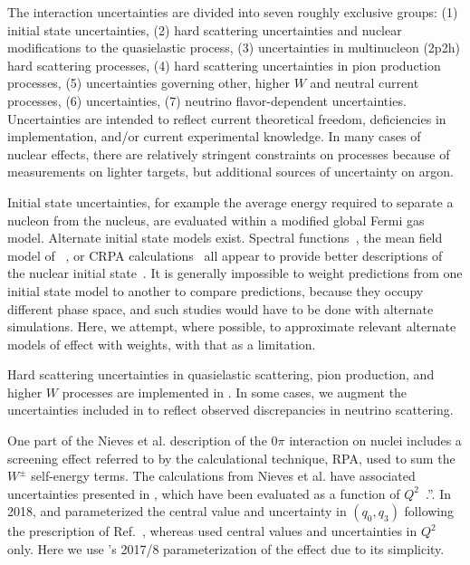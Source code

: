The interaction uncertainties are divided into seven roughly exclusive groups: (1) initial state uncertainties, (2) hard scattering uncertainties and nuclear modifications to the quasielastic process, (3) uncertainties in multinucleon (2p2h) hard scattering processes, (4) hard scattering uncertainties in pion production processes, (5) uncertainties governing other, higher $W$ and neutral current processes, (6)  uncertainties, (7) neutrino flavor-dependent uncertainties. Uncertainties are intended to reflect current theoretical freedom, deficiencies in implementation, and/or current experimental knowledge.  In many cases of nuclear effects, there are relatively stringent constraints on processes because of measurements on lighter targets, but additional sources of uncertainty on argon. 


Initial state uncertainties, for example the average energy required to separate a nucleon from the nucleus, are evaluated within a modified global Fermi gas model.  Alternate initial state models exist. Spectral functions~\cite{Benhar:1994hw,Nieves:2004wx}, the mean field model of ~\cite{Gallmeister:2016dnq}, or %
CRPA calculations~\cite{Pandey:2014tza} all appear to  provide better descriptions of the nuclear initial state~\cite{Sobczyk:2017mts}.   It is generally impossible to weight predictions from one initial state model to another to compare predictions, because they occupy different phase space, and such studies would have to be done with alternate  simulations. Here, we attempt, where possible, to approximate relevant alternate models of effect with weights, with that as a limitation.

Hard scattering uncertainties in quasielastic scattering,  pion production, and higher $W$ processes are implemented in .  In some cases, we augment the uncertainties included in  to reflect observed discrepancies in neutrino scattering.

One part of the Nieves et al.\cite{nieves1,nieves2} description of the $0\pi$ interaction on nuclei includes a screening effect referred to by the calculational technique, RPA, used to sum the $W^\pm$ self-energy terms. 
The calculations from Nieves et al. have associated uncertainties presented in \cite{nieves_uncert}, which have been evaluated as a function of $Q^2$~\cite{sanchez-private}.”.
 In 2018,  and  parameterized the central value and uncertainty in $(q_0, q_3)$ following the prescription of Ref.~\cite{RikRPA}, whereas  used central values and uncertainties in $Q^2$ only. Here we use 's 2017/8 parameterization of the  effect\cite{t2k_2018} due to its simplicity.

